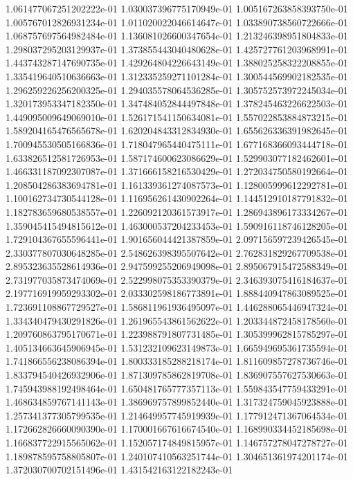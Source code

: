 1.061477067251202222e-01
1.030037396775170949e-01
1.005167263858393750e-01
1.005767012826931234e-01
1.011020022046614647e-01
1.033890738560722666e-01
1.068757697564982484e-01
1.136081026600347654e-01
1.213246398951804833e-01
1.298037295203129937e-01
1.373855443040480628e-01
1.425727761203968991e-01
1.443743287147690735e-01
1.429264804226643149e-01
1.388025258322208855e-01
1.335419640510636663e-01
1.312335259271101284e-01
1.300544569902182535e-01
1.296259226256200325e-01
1.294035578064536285e-01
1.305752573972245034e-01
1.320173953347182350e-01
1.347484052844497848e-01
1.378245463226622503e-01
1.449095009649069010e-01
1.526171541150634081e-01
1.557022853884873215e-01
1.589204165476565678e-01
1.620204843312834930e-01
1.655626336391982645e-01
1.700945530505166836e-01
1.718047965440475111e-01
1.677168366093444718e-01
1.633826512581726953e-01
1.587174600623086629e-01
1.529903077182462601e-01
1.466331187092307087e-01
1.371666158216530429e-01
1.272034750580192664e-01
1.208504286383694781e-01
1.161339361274087573e-01
1.128005999612292781e-01
1.100162734730544128e-01
1.116956261430902264e-01
1.144512910187791832e-01
1.182783659680538557e-01
1.226092120361573917e-01
1.286943896173334267e-01
1.359045415494815612e-01
1.463000537204233453e-01
1.590916118746128205e-01
1.729104367655596441e-01
1.901656044421387859e-01
2.097156597239426545e-01
2.330377807030648285e-01
2.548626398395507642e-01
2.762831829267709538e-01
2.895323635528614936e-01
2.947599255206949098e-01
2.895067915472588349e-01
2.731977035873474069e-01
2.522998075353390379e-01
2.346393075416184637e-01
2.197716919959293302e-01
2.033302598186773891e-01
1.888440947863089525e-01
1.723691108867729527e-01
1.586811961936495097e-01
1.446288065446947324e-01
1.334340479430291826e-01
1.261965543861562622e-01
1.203344872458178560e-01
1.209760863795170671e-01
1.223988791807731485e-01
1.305399962815785297e-01
1.405134663645906945e-01
1.531232109623149873e-01
1.665949695361735594e-01
1.741866556238086394e-01
1.800333185288218174e-01
1.811609857278736746e-01
1.833794540426932906e-01
1.871309785862819708e-01
1.836907557627530663e-01
1.745943988192498464e-01
1.650481765777357113e-01
1.559843547759433291e-01
1.468634859767141143e-01
1.386969757899852440e-01
1.317324759045923888e-01
1.257341377305799535e-01
1.214649957745919939e-01
1.177912471367064534e-01
1.172662826660090390e-01
1.170001667616674540e-01
1.168990334452185698e-01
1.166837722915565062e-01
1.152057174849815957e-01
1.146757278047278727e-01
1.189878595758805807e-01
1.240107410563251744e-01
1.304651361974201174e-01
1.372030700702151496e-01
1.431542163122182243e-01
